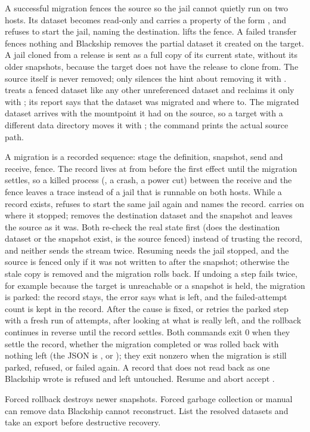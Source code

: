A successful migration fences the source so the jail cannot quietly run on two
hosts. Its dataset becomes read-only and carries a 
property of the form , and
 refuses to start the jail, naming the destination.
 lifts the fence. A failed transfer fences nothing and
Blackship removes the partial dataset it created on the target. A jail cloned
from a release is sent as a full copy of its current state, without its older
snapshots, because the target does not have the release to clone from. The source
itself is never removed;  only silences the hint about removing
it with .  treats a fenced dataset like any
other unreferenced dataset and reclaims it only with ; its
report says that the dataset was migrated and where to. The migrated dataset
arrives with the mountpoint it had on the source, so a target with a different
data directory moves it with ; the command prints
the actual source path.

A migration is a recorded sequence: stage the definition, snapshot, send and
receive, fence. The record lives at  from
before the first effect until the migration settles, so a killed process
(, a crash, a power cut) between the receive and the fence leaves
a trace instead of a jail that is runnable on both hosts. While a record exists,
 refuses to start the same jail again and names the record.
 carries on where it stopped;
 removes the destination dataset and the snapshot
and leaves the source as it was. Both re-check the real state first (does the
destination dataset or the snapshot exist, is the source fenced) instead of
trusting the record, and neither sends the stream twice. Resuming needs the jail
stopped, and the source is fenced only if it was not written to after the snapshot;
otherwise the stale copy is removed and the migration rolls back. If undoing a step fails twice, for example because the target is
unreachable or a snapshot is held, the migration is parked: the record stays, the
error says what is left, and the failed-attempt count is kept in the record. After
the cause is fixed,  or  retries
the parked step with a fresh run of attempts, after looking at what is really left,
and the rollback continues in reverse until the record settles. Both commands exit 0 when they settle the record, whether the migration completed or was rolled back with nothing left (the JSON  is ,  or ); they exit nonzero when the migration is still parked, refused, or failed again. A record that does not read back as one Blackship wrote is refused and left
untouched. Resume and abort accept .

\begin{shipwarning}
Forced rollback destroys newer snapshots. Forced garbage collection or manual
 can remove data Blackship cannot reconstruct. List the
resolved datasets and take an export before destructive recovery.
\end{shipwarning}
